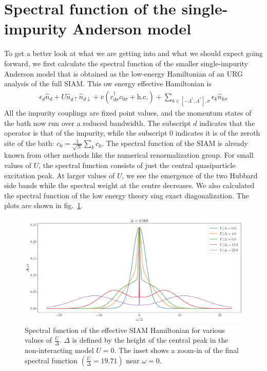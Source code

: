 \documentclass{article}
\numberwithin{equation}{section}
\begin{document}
\section{Spectral function of the single-impurity Anderson model}
To get a better look at what we are getting into and what we should expect going forward, we first calculate the spectral function of the smaller single-impurity Anderson model that is obtained as the low-energy Hamiltonian of an URG analysis of the full SIAM. This ow energy effective Hamiltonian is
\begin{equation}\begin{aligned}
	\epsilon_d \hat n_d + U\hat n_{d \uparrow} \hat n_{d \downarrow} + v \left(c^\dagger_{d\sigma}c_{0\sigma} + \text{h.c.}\right) + \sum_{k \in \left[-\Lambda^*, \Lambda^*\right], \sigma}\epsilon_k \hat n_{k\sigma}
\end{aligned}\end{equation}
All the impurity couplings are fixed point values, and the momentum states of the bath now run over a reduced bandwidth. The subscript \(d\) indicates that the operator is that of the impurity, while the subscript \(0\) indicates it is of the zeroth site of the bath: \(c_0 = \frac{1}{\sqrt N}\sum_k c_k\). The spectral function of the SIAM is already known from other methods like the numerical renormalization group. For small values of \(U\), the spectral function consists of just the central quasiparticle excitation peak. At larger values of \(U\), we see the emergence of the two Hubbard side bands while the spectral weight at the centre decreases. We also calculated the spectral function of the low energy theory sing exact diagonalization. The plots are shown in fig.~\ref{siam_spec_func}.
\begin{figure}[htpb]
	\centering
	\includegraphics[width=\textwidth]{./siam_specfunc_all.pdf}
	\caption{Spectral function of the effective SIAM Hamiltonian for various values of \(\frac{U}{\Delta}\). \(\Delta\) is defined by the height of the central peak in the non-interacting model \(U=0\). The inset shows a zoom-in of the final spectral function \(\left( \frac{U}{\Delta} = 19.71 \right)\) near \(\omega = 0\).}
	\label{siam_spec_func}
\end{figure}
\end{document}
